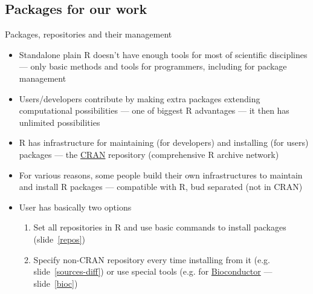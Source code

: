 \documentclass[compress, xelatex, 11pt, xcolor=svgnames, aspectratio=169,
	hyperref={
		bookmarks=true,
		unicode=true,
		colorlinks=true,
		pdftitle={Molecular data in R},
		plainpages=false,
		pdfauthor={Vojtech Zeisek},
		pdfsubject={Course about phylogeny and evolution in R},
		pdfcreator={XeLaTeX},
		pdfkeywords={R, evolution, phylogeny, molecular data},
		linkcolor=Crimson, %
		anchorcolor=Magenta, %
		citecolor=Magenta, %
		filecolor=Magenta, %
		menucolor=Magenta, %
		urlcolor=DodgerBlue, %
		},
	url={hyphens, lowtilde} %
	]{beamer}
\begin{document}
\subsection{Packages for our work}

\begin{frame}{Packages, repositories and their management}
	\begin{itemize}
		\item Standalone plain R doesn't have enough tools for most of scientific disciplines --- only basic methods and tools for programmers, including for package management
		\item Users/developers contribute by making extra packages extending computational possibilities --- one of biggest R advantages --- it then has unlimited possibilities
		\item R has infrastructure for maintaining (for developers) and installing (for users) packages --- the \href{https://CRAN.R-project.org/}{CRAN} repository (comprehensive R archive network)
		\item For various reasons, some people build their own infrastructures to maintain and install R packages --- compatible with R, bud separated (not in CRAN)
		\item User has basically two options
		\begin{enumerate}
			\item Set all repositories in R and use basic commands to install packages (slide~\ref{repos})
			\item Specify non-CRAN repository every time installing from it (e.g. slide~\ref{sources-diff}) or use special tools (e.g. for \href{https://bioconductor.org/install/}{Bioconductor} --- slide~\ref{bioc})
		\end{enumerate}
	\end{itemize}
\end{frame}
\end{document}
